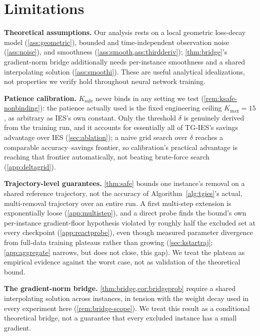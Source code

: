 \documentclass{article}
\theoremstyle{plain}
\theoremstyle{definition}
\theoremstyle{remark}
\begin{document}
\section{Limitations}
\label{sec:limitations}

\textbf{Theoretical assumptions.} Our analysis rests on a local geometric loss-decay model (\cref{ass:geometric}), bounded and time-independent observation noise (\cref{ass:noise}), and smoothness (\cref{ass:smooth,ass:thirdderiv}); \cref{thm:bridge}'s gradient-norm bridge additionally needs per-instance smoothness and a shared interpolating solution (\cref{ass:smoothi}). These are useful analytical idealizations, not properties we verify hold throughout neural network training.

\textbf{Patience calibration.} $K_{\mathrm{safe}}$ never binds in any setting we test (\cref{rem:ksafe-nonbinding}): the patience actually used is the fixed engineering ceiling $K_{\max}=15$, as arbitrary as IES's own constant. Only the threshold $\delta$ is genuinely derived from the training run, and it accounts for essentially all of TG-IES's savings advantage over IES (\cref{sec:ablation}); a naive grid search over $\delta$ reaches a comparable accuracy--savings frontier, so calibration's practical advantage is reaching that frontier automatically, not beating brute-force search (\cref{app:deltagrid}).

\textbf{Trajectory-level guarantees.} \cref{thm:safe} bounds one instance's removal on a shared reference trajectory, not the accuracy of Algorithm~\ref{alg:tgies}'s actual, multi-removal trajectory over an entire run. A first multi-step extension is exponentially loose (\cref{app:multistep}), and a direct probe finds the bound's own per-instance gradient-floor hypothesis violated by roughly half the excluded set at every checkpoint (\cref{app:reactprobe}), even though measured parameter divergence from full-data training plateaus rather than growing (\cref{sec:kstartraj}; \cref{app:aggregate} narrows, but does not close, this gap). We treat the plateau as empirical evidence against the worst case, not as validation of the theoretical bound.

\textbf{The gradient-norm bridge.} \cref{thm:bridge,cor:bridgeprob} require a shared interpolating solution across instances, in tension with the weight decay used in every experiment here (\cref{rem:bridge-scope}). We treat this result as a conditional theoretical bridge, not a guarantee that every excluded instance has a small gradient.
\end{document}
